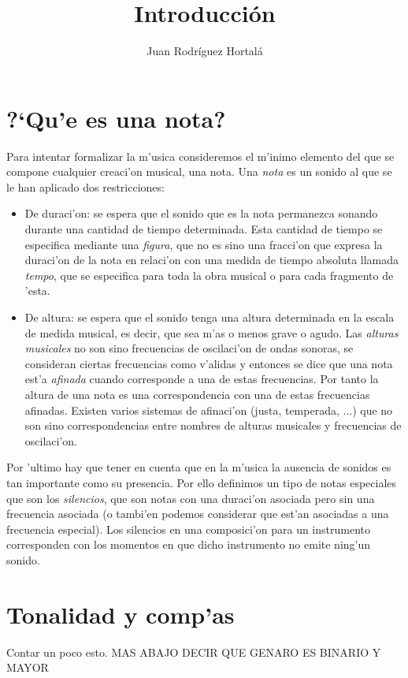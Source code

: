 \documentclass[a4paper,12pt]{article}
\author{Juan Rodr\'iguez Hortal\'a}
\title{Introducci\'on}
\begin{document}
\maketitle
\tableofcontents
\section{?`Qu'e es una nota?}
Para intentar formalizar la m'usica consideremos el m'inimo elemento del que se compone cualquier creaci'on musical, una  nota. Una \emph{nota} es un sonido al que se le han aplicado dos restricciones:
\begin{itemize}
\item De duraci'on: se espera que el sonido que es la nota permanezca sonando durante una cantidad de tiempo determinada. Esta cantidad de tiempo se especifica mediante una \emph{figura}, que no es sino una fracci'on que expresa la duraci'on de la nota en relaci'on con una medida de tiempo absoluta llamada \emph{tempo}, que se especifica para toda la obra musical o para cada fragmento de 'esta.
\item De altura: se espera que el sonido tenga una altura determinada en la escala de medida musical, es decir, que sea m'as o menos grave o agudo. Las \emph{alturas musicales} no son sino frecuencias de oscilaci'on de ondas sonoras, se consideran ciertas frecuencias como v'alidas y entonces se dice que una nota est'a \emph{afinada} cuando corresponde a una de estas frecuencias. Por tanto la altura de una nota es una correspondencia con una de estas frecuencias afinadas. Existen varios sistemas de afinaci'on (justa, temperada, ...) que no son sino correspondencias entre nombres de alturas musicales y frecuencias de oscilaci'on.
\end{itemize}

Por 'ultimo hay que tener en cuenta que en la m'usica la ausencia de sonidos es tan importante como su presencia. Por ello definimos un tipo de notas especiales que son los \emph{silencios}, que son notas con una duraci'on asociada pero sin una frecuencia asociada (o tambi'en podemos considerar que est'an asociadas a una frecuencia especial). Los silencios en una composici'on para un instrumento corresponden con los momentos en que dicho instrumento no emite ning'un sonido.

\section{Tonalidad y comp'as}

Contar un poco esto. MAS ABAJO DECIR QUE GENARO ES BINARIO Y MAYOR
\end{document}
